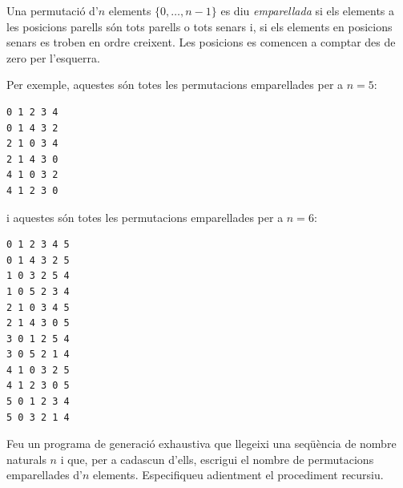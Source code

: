 

\Statement

Una permutació d'$n$ elements $\{0,\dots,n-1\}$ es diu \emph{emparellada} si els elements a les posicions parells són tots parells o tots senars i, si els elements en posicions senars es troben en ordre creixent. Les posicions es comencen a comptar des de zero per l'esquerra.

\medskip

Per exemple, aquestes són totes les permutacions emparellades per a $n=5$:

\begin{verbatim}
0 1 2 3 4
0 1 4 3 2
2 1 0 3 4
2 1 4 3 0
4 1 0 3 2
4 1 2 3 0
\end{verbatim}

i aquestes són totes les permutacions emparellades per a $n=6$:

\begin{verbatim}
0 1 2 3 4 5
0 1 4 3 2 5
1 0 3 2 5 4
1 0 5 2 3 4
2 1 0 3 4 5
2 1 4 3 0 5
3 0 1 2 5 4
3 0 5 2 1 4
4 1 0 3 2 5
4 1 2 3 0 5
5 0 1 2 3 4
5 0 3 2 1 4
\end{verbatim}

\medskip

Feu un programa de generació exhaustiva que llegeixi una seqüència de nombre naturals $n$ i que, per a cadascun d'ells, escrigui el nombre de permutacions emparellades d'$n$ elements. Especifiqueu adientment el procediment recursiu.



\Sample
